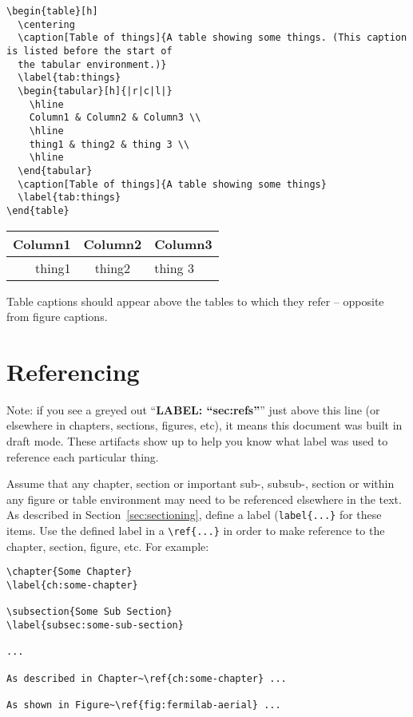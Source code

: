 \begin{verbatim}
\begin{table}[h]
  \centering
  \caption[Table of things]{A table showing some things. (This caption is listed before the start of
  the tabular environment.)}
  \label{tab:things}
  \begin{tabular}[h]{|r|c|l|}
    \hline
    Column1 & Column2 & Column3 \\
    \hline
    thing1 & thing2 & thing 3 \\
    \hline
  \end{tabular}
  \caption[Table of things]{A table showing some things}
  \label{tab:things}
\end{table}
\end{verbatim}
\begin{table}[h]
  \centering
  \begin{tabular}[h]{|r|c|l|}
    \hline
    Column1 & Column2 & Column3 \\
    \hline
    thing1 & thing2 & thing 3 \\
    \hline
  \end{tabular}
\end{table}

Table captions should appear above the tables to which they refer -- opposite from figure captions.

\section{Referencing}
\label{sec:refs}

Note: if you see a greyed out ``\textbf{LABEL: ``sec:refs''}'' just above this
line (or elsewhere in chapters, sections, figures, etc), it means this
document was built in draft mode.  These artifacts show up to help you know what label
was used to reference each particular thing.

Assume that any chapter, section or important sub-, subsub-,  section or
within any figure or table environment may need to be referenced
elsewhere in the text. As described in Section~\ref{sec:sectioning}, define a label (\verb|label{...}|
for these items.
Use the defined label in a \verb|\ref{...}| in order to
make reference to the chapter, section, figure, etc.  For example:

\begin{verbatim}
\chapter{Some Chapter}
\label{ch:some-chapter}

\subsection{Some Sub Section}
\label{subsec:some-sub-section}

...

As described in Chapter~\ref{ch:some-chapter} ...

As shown in Figure~\ref{fig:fermilab-aerial} ...
\end{verbatim}

